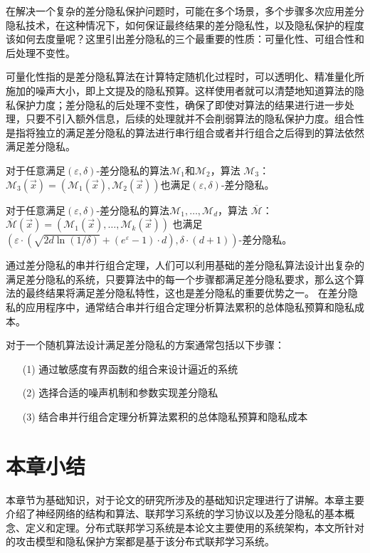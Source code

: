 在解决一个复杂的差分隐私保护问题时，可能在多个场景，多个步骤多次应用差分隐私技术，在这种情况下，如何保证最终结果的差分隐私性，以及隐私保护的程度该如何去度量呢？这里引出差分隐私的三个最重要的性质：可量化性、可组合性和后处理不变性。

可量化性指的是差分隐私算法在计算特定随机化过程时，可以透明化、精准量化所施加的噪声大小，即上文提及的隐私预算。这样使用者就可以清楚地知道算法的隐私保护力度；差分隐私的后处理不变性，确保了即使对算法的结果进行进一步处理，只要不引入额外信息，后续的处理就并不会削弱算法的隐私保护力度。组合性是指将独立的满足差分隐私的算法进行串行组合或者并行组合之后得到的算法依然满足差分隐私。

\begin{theorem}\label{串行组合}
对于任意满足$(\varepsilon, \delta)$-差分隐私的算法$\mathcal{M}_{1}$和$\mathcal{M}_{2}$，算法 $\mathcal{M}_{3}$：$\mathcal{M}_{3}(\vec{x})=\left(\mathcal{M}_{1}(\vec{x}), \mathcal{M}_{2}(\vec{x})\right)$也满足$(\varepsilon, \delta)$-差分隐私。
\end{theorem}

\begin{theorem}\label{并行组合}
对于任意满足$(\varepsilon, \delta)$-差分隐私的算法$\mathcal{M}_{1}, \ldots, \mathcal{M}_{d}$，算法 $\overline{\mathcal{M}}$：$\overline{\mathcal{M}}(\vec{x})=\left(\mathcal{M}_{1}(\vec{x}), \ldots, \mathcal{M}_{k}(\vec{x})\right)$ 也满足$\left(\varepsilon \cdot\left(\sqrt{2 d \ln (1 / \delta)}+\left(e^{\varepsilon}-1\right) \cdot d\right), \delta \cdot(d+1)\right)$-差分隐私。
\end{theorem}

通过差分隐私的串并行组合定理，人们可以利用基础的差分隐私算法设计出复杂的满足差分隐私的系统，只要算法中的每一个步骤都满足差分隐私要求，那么这个算法的最终结果将满足差分隐私特性，这也是差分隐私的重要优势之一。 在差分隐私的应用程序中，通常结合串并行组合定理分析算法累积的总体隐私预算和隐私成本。

对于一个随机算法设计满足差分隐私的方案通常包括以下步骤：
\begin{enumerate}
\item [(1)] 通过敏感度有界函数的组合来设计逼近的系统
\item [(2)] 选择合适的噪声机制和参数实现差分隐私
\item [(3)] 结合串并行组合定理分析算法累积的总体隐私预算和隐私成本
\end{enumerate}

\section{本章小结}
本章节为基础知识，对于论文的研究所涉及的基础知识定理进行了讲解。本章主要介绍了神经网络的结构和算法、联邦学习系统的学习协议以及差分隐私的基本概念、定义和定理。分布式联邦学习系统是本论文主要使用的系统架构，本文所针对的攻击模型和隐私保护方案都是基于该分布式联邦学习系统。
